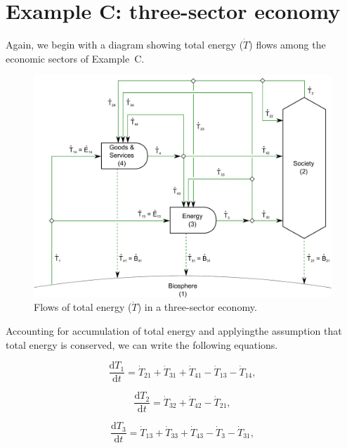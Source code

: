 \section{Example C: three-sector economy}

Again, we begin with a diagram showing total energy ($\dot{T}$) flows
among the economic sectors of Example~C.

\begin{figure}[h!]
\includegraphics[width=1.0\linewidth]{Part_2/Chapter_Embodied/images/3_sector_embodied_energy.pdf}
\caption{Flows of total energy ($\dot{T}$) in a three-sector economy.}
\label{fig:C_total_energy}
\end{figure}

Accounting for accumulation of total energy and 
applyingthe assumption that total energy is conserved, 
we can write the following equations.

\begin{equation} \label{eq:C-CV_T_1}
	\frac{\mathrm{d}T_{1}}{\mathrm{d}t} 	 
	= \dot{T}_{21} 
	+ \dot{T}_{31} 
	+ \dot{T}_{41} 
	- \dot{T}_{13} 
	- \dot{T}_{14},
\end{equation}

\begin{equation} \label{eq:C-CV_T_2}
	\frac{\mathrm{d}T_{2}}{\mathrm{d}t} 	 
	= \dot{T}_{32} 
	+ \dot{T}_{42} 
	- \dot{T}_{21},
\end{equation}

\begin{equation} \label{eq:C-CV_T_3}
	\frac{\mathrm{d}T_{3}}{\mathrm{d}t} 	 
	= \dot{T}_{13} 
	+ \dot{T}_{33} 
	+ \dot{T}_{43} 
	- \dot{T}_{3} 
	- \dot{T}_{31},
\end{equation}

